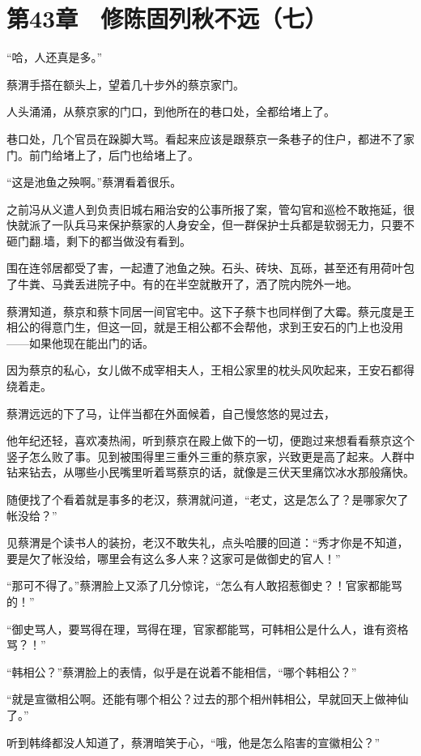 \section{第43章　修陈固列秋不远（七）}

“哈，人还真是多。”

蔡渭手搭在额头上，望着几十步外的蔡京家门。

人头涌涌，从蔡京家的门口，到他所在的巷口处，全都给堵上了。

巷口处，几个官员在跺脚大骂。看起来应该是跟蔡京一条巷子的住户，都进不了家门。前门给堵上了，后门也给堵上了。

“这是池鱼之殃啊。”蔡渭看着很乐。

之前冯从义遣人到负责旧城右厢治安的公事所报了案，管勾官和巡检不敢拖延，很快就派了一队兵马来保护蔡家的人身安全，但一群保护士兵都是软弱无力，只要不砸门翻.墙，剩下的都当做没有看到。

围在连邻居都受了害，一起遭了池鱼之殃。石头、砖块、瓦砾，甚至还有用荷叶包了牛粪、马粪丢进院子中。有的在半空就散开了，洒了院内院外一地。

蔡渭知道，蔡京和蔡卞同居一间官宅中。这下子蔡卞也同样倒了大霉。蔡元度是王相公的得意门生，但这一回，就是王相公都不会帮他，求到王安石的门上也没用——如果他现在能出门的话。

因为蔡京的私心，女儿做不成宰相夫人，王相公家里的枕头风吹起来，王安石都得绕着走。

蔡渭远远的下了马，让伴当都在外面候着，自己慢悠悠的晃过去，

他年纪还轻，喜欢凑热闹，听到蔡京在殿上做下的一切，便跑过来想看看蔡京这个竖子怎么败了事。见到被围得里三重外三重的蔡京家，兴致更是高了起来。人群中钻来钻去，从哪些小民嘴里听着骂蔡京的话，就像是三伏天里痛饮冰水那般痛快。

随便找了个看着就是事多的老汉，蔡渭就问道，“老丈，这是怎么了？是哪家欠了帐没给？”

见蔡渭是个读书人的装扮，老汉不敢失礼，点头哈腰的回道：“秀才你是不知道，要是欠了帐没给，哪里会有这么多人来？这家可是做御史的官人！”

“那可不得了。”蔡渭脸上又添了几分惊诧，“怎么有人敢招惹御史？！官家都能骂的！”

“御史骂人，要骂得在理，骂得在理，官家都能骂，可韩相公是什么人，谁有资格骂？！”

“韩相公？”蔡渭脸上的表情，似乎是在说着不能相信，“哪个韩相公？”

“就是宣徽相公啊。还能有哪个相公？过去的那个相州韩相公，早就回天上做神仙了。”

听到韩绛都没人知道了，蔡渭暗笑于心，“哦，他是怎么陷害的宣徽相公？”

